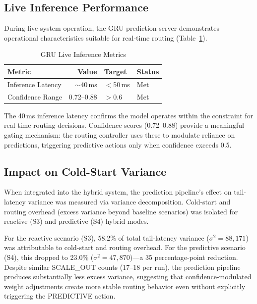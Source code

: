 \documentclass[conference,letterpaper]{IEEEtran}
\begin{document}
\subsection{Live Inference Performance}

During live system operation, the GRU prediction server demonstrates operational characteristics suitable for real-time routing (Table~\ref{tab:inference}).

\begin{table}[htbp]
\caption{GRU Live Inference Metrics}
\label{tab:inference}
\centering
\small
\begin{tabular}{lrll}
\toprule
\textbf{Metric} & \textbf{Value} & \textbf{Target} & \textbf{Status} \\
\midrule
Inference Latency & $\sim$40\,ms & $<$50\,ms & Met \\
Confidence Range & 0.72--0.88 & $>$0.6 & Met \\
\bottomrule
\end{tabular}
\end{table}

The 40\,ms inference latency confirms the model operates within the constraint for real-time routing decisions. Confidence scores (0.72--0.88) provide a meaningful gating mechanism: the routing controller uses these to modulate reliance on predictions, triggering predictive actions only when confidence exceeds 0.5.

\subsection{Impact on Cold-Start Variance}

When integrated into the hybrid system, the prediction pipeline's effect on tail-latency variance was measured via variance decomposition. Cold-start and routing overhead (excess variance beyond baseline scenarios) was isolated for reactive (S3) and predictive (S4) hybrid modes.

For the reactive scenario (S3), 58.2\% of total tail-latency variance ($\sigma^2 = 88{,}171$) was attributable to cold-start and routing overhead. For the predictive scenario (S4), this dropped to 23.0\% ($\sigma^2 = 47{,}870$)---a 35 percentage-point reduction. Despite similar SCALE\_OUT counts (17--18 per run), the prediction pipeline produces substantially less excess variance, suggesting that confidence-modulated weight adjustments create more stable routing behavior even without explicitly triggering the PREDICTIVE action.
\end{document}
